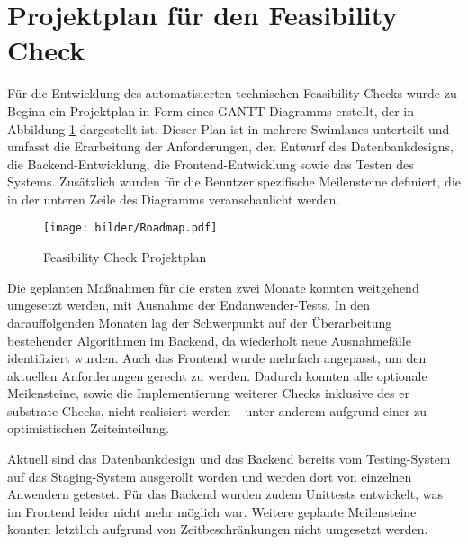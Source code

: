\section{Projektplan für den Feasibility Check}
Für die Entwicklung des automatisierten technischen Feasibility Checks wurde zu Beginn ein Projektplan in Form eines GANTT-Diagramms erstellt, der in Abbildung \ref{fig:roadmap} dargestellt ist. Dieser Plan ist in mehrere Swimlanes unterteilt und umfasst die Erarbeitung der Anforderungen, den Entwurf des Datenbankdesigns, die Backend-Entwicklung, die Frontend-Entwicklung sowie das Testen des Systems. Zusätzlich wurden für die Benutzer spezifische Meilensteine definiert, die in der unteren Zeile des Diagramms veranschaulicht werden.

\begin{figure}[!htbp]
    \centering
    \texttt{[image: bilder/Roadmap.pdf]}
    \caption{Feasibility Check Projektplan}
    \label{fig:roadmap}
\end{figure}

Die geplanten Maßnahmen für die ersten zwei Monate konnten weitgehend umgesetzt werden, mit Ausnahme der Endanwender-Tests. In den darauffolgenden Monaten lag der Schwerpunkt auf der Überarbeitung bestehender Algorithmen im Backend, da wiederholt neue Ausnahmefälle identifiziert wurden. Auch das Frontend wurde mehrfach angepasst, um den aktuellen Anforderungen gerecht zu werden. Dadurch konnten alle optionale Meilensteine, sowie die Implementierung weiterer Checks inklusive des er \gls{substrate} Checks, nicht realisiert werden – unter anderem aufgrund einer zu optimistischen Zeiteinteilung.

Aktuell sind das Datenbankdesign und das Backend bereits vom Testing-System auf das Staging-System ausgerollt worden und werden dort von einzelnen Anwendern getestet. Für das Backend wurden zudem Unittests entwickelt, was im Frontend leider nicht mehr möglich war. Weitere geplante Meilensteine konnten letztlich aufgrund von Zeitbeschränkungen nicht umgesetzt werden.